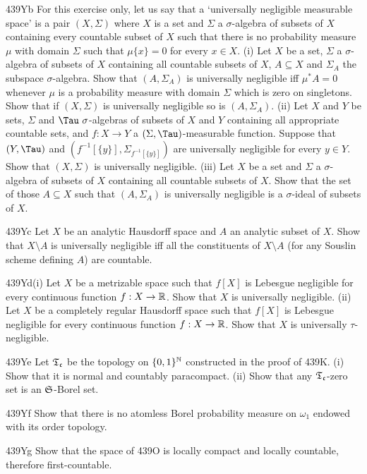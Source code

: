 {\spheader 439Yb For this exercise only, let us say that a `universally
negligible measurable space' is a pair $(X,\Sigma)$ where $X$ is a set
and $\Sigma$ a $\sigma$-algebra of subsets of $X$ containing every
countable subset of $X$ such that there is no probability measure $\mu$
with domain $\Sigma$ such that $\mu\{x\}=0$ for every $x\in X$.
(i) Let $X$ be a set, $\Sigma$ a $\sigma$-algebra of subsets of $X$
containing all countable subsets of $X$, $A\subseteq X$ and $\Sigma_A$
the subspace $\sigma$-algebra.   Show that $(A,\Sigma_A)$ is universally
negligible iff $\mu^*A=0$ whenever $\mu$ is a probability measure with
domain $\Sigma$ which is zero on singletons.   Show that if $(X,\Sigma)$
is universally negligible so is $(A,\Sigma_A)$.   (ii) Let $X$ and $Y$
be sets, $\Sigma$ and $\Tau\,\,\sigma$-algebras of subsets of $X$ and
$Y$ containing all appropriate countable sets, and $f:X\to Y$ a
$(\Sigma,\Tau)$-measurable function.   Suppose that $(Y,\Tau)$ and
$(f^{-1}[\{y\}],\Sigma_{f^{-1}[\{y\}]})$ are universally negligible for
every $y\in Y$.   Show that $(X,\Sigma)$ is universally negligible.
(iii) Let $X$ be a set and $\Sigma$ a $\sigma$-algebra of subsets of $X$
containing all countable subsets of $X$.   Show that the set of those
$A\subseteq X$ such that $(A,\Sigma_A)$ is universally negligible is a
$\sigma$-ideal of subsets of $X$.

\spheader 439Yc Let $X$ be an analytic Hausdorff
space and $A$ an analytic subset
of $X$.   Show that $X\setminus A$ is universally negligible iff all the
constituents of $X\setminus A$ (for any Souslin scheme defining $A$) are
countable.

\spheader 439Yd(i) Let $X$ be a metrizable space such that $f[X]$ is
Lebesgue negligible for every continuous function $f:X\to\Bbb R$.   Show
that $X$ is universally negligible.   (ii) Let $X$ be a completely
regular Hausdorff space such that $f[X]$ is Lebesgue negligible for
every continuous function $f:X\to\Bbb R$.   Show that $X$ is universally
$\tau$-negligible.

\spheader 439Ye Let $\frak T_{\frak c}$ be the topology on
$\{0,1\}^{\Bbb N}$
constructed in the proof of 439K.   (i) Show that it is normal and
countably paracompact.   (ii)
Show that any $\frak T_{\frak c}$-zero set is an $\frak S$-Borel set.

\spheader 439Yf Show that there is no atomless Borel probability measure
on $\omega_1$ endowed with its order topology.   

\spheader 439Yg Show that the space of 439O is locally compact and locally
countable, therefore first-countable.

}
